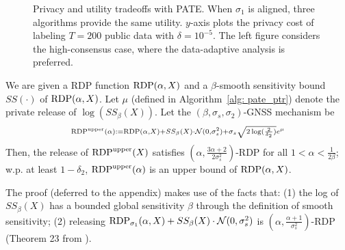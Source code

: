 \begin{figure*}[t]
	\centering	
	\caption{Privacy and utility tradeoffs with PATE. 
	When $\sigma_1$ is aligned, three algorithms provide the same utility. $y$-axis plots the privacy cost of labeling $T=200$ public data with $\delta = 10^{-5}$.
   The left figure considers the high-consensus case, where the data-adaptive analysis is preferred.} 
	\label{fig: exp_pate}
\end{figure*}

\begin{lemma}\label{lem: upperbound}
We are given a RDP function $\mathrm{RDP}(\alpha, X)$ and a $\beta$-smooth sensitivity bound $SS(\cdot)$ of $\mathrm{RDP}(\alpha, X)$. Let $\mu$ (defined in Algorithm~\ref{alg: pate_ptr}) denote the private release of $\log(SS_\beta(X))$. Let the $(\beta, \sigma_s, \sigma_2)$-GNSS mechanism be 
\[\scriptstyle
\mathrm{RDP}^{\text{upper}}(\alpha):=\mathrm{RDP}(\alpha, X) + SS_\beta(X) \cdot \mathcal{N}(0, \sigma_s^2) + \sigma_s \sqrt{2\log(\frac{2}{\delta_2}) } e^{\mu} \]
	 Then, the release of $\mathrm{RDP}^{\text{upper}}(X)$ satisfies $(\alpha, \frac{3\alpha +2}{2\sigma_s^2})$-RDP for all $1<\alpha < \frac{1}{2\beta}$; w.p. at least $1-\delta_2$, $\mathrm{RDP}^{\text{upper}}(\alpha)$ is an upper bound of $\mathrm{RDP}(\alpha, X)$.
\end{lemma}


The proof (deferred to the appendix) makes use of the facts that: (1) the log of $SS_\beta(X)$ has a bounded global sensitivity $\beta$ through the definition of smooth sensitivity; (2) releasing $\mathrm{RDP}_{\sigma_1}(\alpha, X)+ SS_\beta(X)\cdot \mathcal{N}(0, \sigma_s^2)$ is $(\alpha, \frac{\alpha+1}{\sigma_s^2})$-RDP (Theorem 23 from \citet{papernot2018scalable}).




